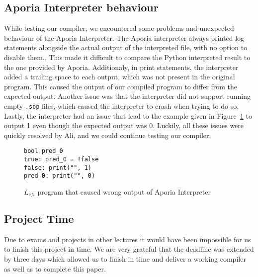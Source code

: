 \subsection{Aporia Interpreter behaviour}
While testing our compiler, we encountered some problems and unexpected behaviour of the Aporia Interpreter. The Aporia interpreter always printed log statements alongside the actual output of the interpreted file, with no option to disable them.. This made it difficult to compare the Python interpreted result to the one provided by Aporia.
Additionaly, in print statements, the interpreter added a trailing space to each output, which was not present in the original program. This caused the output of our compiled program to differ from the expected output.
Another issue was that the interpreter did not support running empty \texttt{.spp} files, which caused the interpreter to crash when trying to do so.
Lastly, the interpreter had an issue that lead to the example given in Figure~\ref{code:aporia_issue} to output 1 even though the expected output was 0.
Luckily, all these issues were quickly resolved by Ali, and we could continue testing our compiler.

\begin{figure}[h!]
	\begin{lstlisting}
bool pred_0
true: pred_0 = !false
false: print("", 1)
pred_0: print("", 0) 
	\end{lstlisting}
	\caption{$L_{cfi}$ program that caused wrong output of Aporia Interpreter}
	\label{code:aporia_issue}
\end{figure}

\subsection{Project Time}
Due to exams and projects in other lectures it would have been impossible for us to finish this project in time. We are very grateful that the deadline was extended by three days which allowed us to finish in time and deliver a working compiler as well as to complete this paper.

